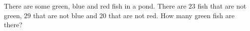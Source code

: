 There are some green, blue and red fish in a pond. There are $23$ fish that are not green, $29$ that are not blue and $20$ that are not red. How many green fish are there?
